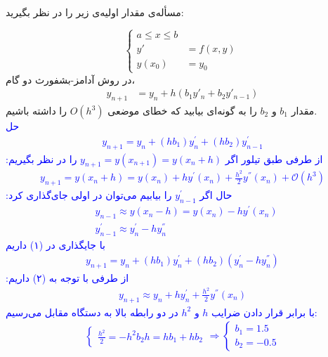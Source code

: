 \\
مسأله‌ی مقدار اولیه‌ی زیر را در نظر بگیرید:

\begin{equation*}
    \begin{cases}
        a \leq x \leq b \\
        y' &= f(x, y) \\
        y(x_0) &= y_0
    \end{cases}\,
\end{equation*}
در روش آدامز-بشفورث دو گام،
\begin{align*}
y_{n+1} &= y_n + h(b_1y'_n + b_2y'_{n-1})
\end{align*}
مقدار
$b_1$
و
$b_2$
را به گونه‌ای بیابید که خطای موضعی
$O(h^3)$
را داشته باشیم.
\\
\textcolor{blue}{حل
\begin{align}
    y_{n + 1} = y_n + (hb_1) y^{'}_n + (hb_2) y^{'}_{n - 1}
\end{align}
از طرفی طبق تیلور اگر
$y_{n + 1} = y (x_{n + 1}) = y(x_{n} + h)$
را در نظر بگیریم:
\begin{align}
    y_{n + 1} = y(x_n + h) = y(x_n) + h y^{'}(x_n) + \frac{h^2}{2} y^{''}(x_n) + \mathcal{O}(h^3)
\end{align}
حال اگر 
$y^{'}_{n - 1}$
را بیابیم می‌توان در اولی جای‌گذاری کرد:
\begin{align*}
    &y_{n - 1} \approx y (x_n - h) = y(x_n) - hy^{'}(x_n) \\
    &y^{'}_{n - 1} \approx y^{'}_{n} - h y^{''}_n
\end{align*}
با جایگذاری در
(۱)
داریم 
\begin{align*}
    y_{n + 1} = y_n + (hb_1) y^{'}_n + (h b_2) (y^{'}_n - h y^{''}_n)
\end{align*}
از طرفی با توجه به  
(۲)
داریم:
\begin{align*}
    y_{n + 1} \approx y_n + h y^{'}_n + \frac{h^2}{2} y^{''}(x_n)
\end{align*}
با برابر قرار دادن ضرایب 
$h$
و
$h^2$
در دو رابطه بالا به دستگاه مقابل می‌رسیم:
\begin{align*}
    \begin{cases}
        \frac{h^2}{2} = -h^2 b_2
        h = h b_1 + h b_2 
    \end{cases} \Rightarrow \begin{cases}
        b_1 = 1.5 \\
        b_2 = -0.5
    \end{cases}
\end{align*}
}